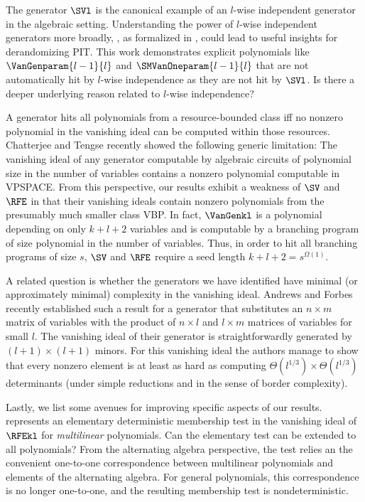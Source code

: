 \documentclass{toc}
\begin{document}
The generator $\SVl$ is the canonical example of an $l$-wise independent generator in the algebraic setting. Understanding the power of $l$-wise independent generators more broadly, \eg, as formalized in \cite{FSTW21, MediniShpilka2021}, could lead to useful insights for derandomizing PIT. This work demonstrates explicit polynomials like \(\VanGenparam{l-1}{l}\) and \(\SMVanOneparam{l-1}{l}\) that are not automatically hit by \(l\)-wise independence as they are not hit by \(\SVl\). Is there a deeper underlying reason related to $l$-wise independence?

A generator hits all polynomials from a resource-bounded class iff no nonzero polynomial in the vanishing ideal can be computed within those resources. Chatterjee and Tengse \cite{CT2023} recently showed the following generic limitation: The vanishing ideal of any generator computable by algebraic circuits of polynomial size in the number of variables contains a nonzero polynomial computable in VPSPACE. From this perspective, our results exhibit a weakness of $\SV$ and $\RFE$ in that their vanishing ideals contain nonzero polynomials from the presumably much smaller class VBP. In fact, $\VanGenkl$ is a polynomial depending on only $k+l+2$ variables and is computable by a branching program of size polynomial in the number of variables. Thus, in order to hit all branching programs of size $s$, $\SV$ and $\RFE$ require a seed length $k+l+2=s^{\Omega(1)}$. 

A related question is whether the generators we have identified have minimal (or approximately minimal) complexity in the vanishing ideal. Andrews and Forbes \cite{AndrewsForbes2022} recently established such a result for a generator that substitutes an $n\times m$ matrix of variables with the product of $n\times l$ and $l \times m$ matrices of variables for small $l$. The vanishing ideal of their generator is straightforwardly generated by $(l+1) \times (l+1)$ minors. For this vanishing ideal the authors manage to show that every nonzero element is at least as hard as computing $\Theta(l^{1/3})\times \Theta(l^{1/3})$ determinants (under simple reductions and in the sense of border complexity). 

Lastly, we list some avenues for improving specific aspects of our results.  represents an elementary deterministic membership test in the vanishing ideal of $\RFEkl$ for \emph{multilinear} polynomials. Can the elementary test can be extended to all polynomials? From the alternating algebra perspective, the test relies an the convenient one-to-one correspondence between multilinear polynomials and elements of the alternating algebra. For general polynomials, this correspondence is no longer one-to-one, and the resulting membership test is nondeterministic.
\end{document}
